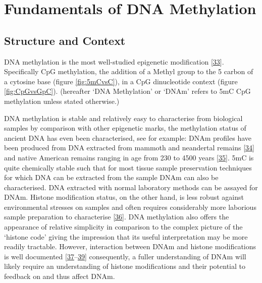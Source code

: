 \documentclass[
]{book}
\begin{document}
\hypertarget{fundamentals-of-dna-methylation}{%
\section{Fundamentals of DNA Methylation}\label{fundamentals-of-dna-methylation}}

\hypertarget{structure-and-context}{%
\subsection{Structure and Context}\label{structure-and-context}}

DNA methylation is the most well-studied epigenetic modification {[}\protect\hyperlink{ref-Haluskova2010}{33}{]}.
Specifically CpG methylation, the addition of a Methyl group to the 5 carbon of a cytosine base (figure \ref{fig:5mCvsC}), in a CpG dinucleotide context (figure \ref{fig:CpGvsGpC}).
(hereafter `DNA Methylation' or `DNAm' refers to 5mC CpG methylation unless stated otherwise.)

DNA methylation is stable and relatively easy to characterise from biological samples by comparison with other epigenetic marks, the methylation status of ancient DNA has even been characterised, see for example:
DNAm profiles have been produced from DNA extracted from mammoth and neandertal remains {[}\protect\hyperlink{ref-Briggs2010}{34}{]} and native American remains ranging in age from 230 to 4500 years {[}\protect\hyperlink{ref-Smith2015}{35}{]}.
5mC is quite chemically stable such that for most tissue sample preservation techniques for which DNA can be extracted from the sample DNAm can also be characterised.
DNA extracted with normal laboratory methods can be assayed for DNAm.
Histone modification status, on the other hand, is less robust against environmental stresses on samples and often requires considerably more laborious sample preparation to characterise {[}\protect\hyperlink{ref-Bauden2017}{36}{]}.
DNA methylation also offers the appearance of relative simplicity in comparison to the complex picture of the `histone code' giving the impression that its useful interpretation may be more readily tractable.
However, interaction between DNAm and histone modifications is well documented {[}\protect\hyperlink{ref-Hashimshony2003}{37}--\protect\hyperlink{ref-Rose2014}{39}{]} consequently, a fuller understanding of DNAm will likely require an understanding of histone modifications and their potential to feedback on and thus affect DNAm.
\end{document}
